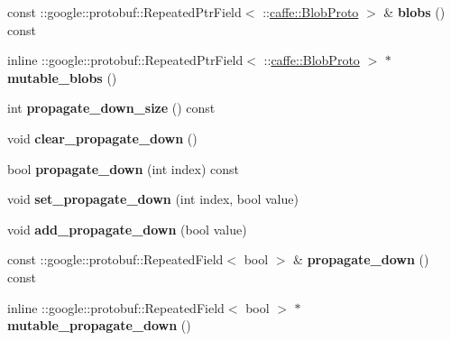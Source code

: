 \begin{DoxyCompactItemize}
\item 
\mbox{\label{classcaffe_1_1_layer_parameter_a7a7823f6eecfb370d09a5004ee98a734}} 
const \+::google\+::protobuf\+::\+Repeated\+Ptr\+Field$<$ \+::\mbox{\hyperlink{classcaffe_1_1_blob_proto}{caffe\+::\+Blob\+Proto}} $>$ \& {\bfseries blobs} () const
\item 
\mbox{\label{classcaffe_1_1_layer_parameter_a4e0fcaa197c45a5e5a12dc57a3ed62ef}} 
inline \+::google\+::protobuf\+::\+Repeated\+Ptr\+Field$<$ \+::\mbox{\hyperlink{classcaffe_1_1_blob_proto}{caffe\+::\+Blob\+Proto}} $>$ $\ast$ {\bfseries mutable\+\_\+blobs} ()
\item 
\mbox{\label{classcaffe_1_1_layer_parameter_a0bb492dd2c13f8d6c8698f4b3837c04f}} 
int {\bfseries propagate\+\_\+down\+\_\+size} () const
\item 
\mbox{\label{classcaffe_1_1_layer_parameter_a908b57eb3a591486ab4819822ecfd57d}} 
void {\bfseries clear\+\_\+propagate\+\_\+down} ()
\item 
\mbox{\label{classcaffe_1_1_layer_parameter_a9d06015b62b04e5656909a221f05326f}} 
bool {\bfseries propagate\+\_\+down} (int index) const
\item 
\mbox{\label{classcaffe_1_1_layer_parameter_a9d89653a41b5e0824cf4a9a007bc366b}} 
void {\bfseries set\+\_\+propagate\+\_\+down} (int index, bool value)
\item 
\mbox{\label{classcaffe_1_1_layer_parameter_a701b37460c3e75243d212bea0cc52cd3}} 
void {\bfseries add\+\_\+propagate\+\_\+down} (bool value)
\item 
\mbox{\label{classcaffe_1_1_layer_parameter_a33537367bc8f029ea0b5e383d62c9d35}} 
const \+::google\+::protobuf\+::\+Repeated\+Field$<$ bool $>$ \& {\bfseries propagate\+\_\+down} () const
\item 
\mbox{\label{classcaffe_1_1_layer_parameter_aab21428a734552080f164f67a66d0247}} 
inline \+::google\+::protobuf\+::\+Repeated\+Field$<$ bool $>$ $\ast$ {\bfseries mutable\+\_\+propagate\+\_\+down} ()

\end{DoxyCompactItemize}
